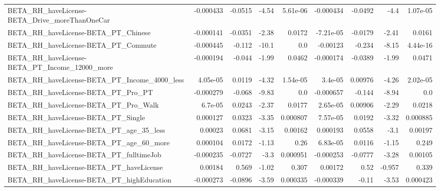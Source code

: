 \begin{tabular}{lrrrrrrrr}
BETA\_RH\_haveLicense-BETA\_Drive\_moreThanOneCar      &   -0.000433 &      -0.0515 &     -4.54 & 5.61e-06 &  -0.000434 &     -0.0492 &         -4.4 &      1.07e-05 \\
BETA\_RH\_haveLicense-BETA\_PT\_Chinese                &   -0.000141 &      -0.0351 &     -2.38 &   0.0172 &  -7.21e-05 &     -0.0179 &        -2.41 &        0.0161 \\
BETA\_RH\_haveLicense-BETA\_PT\_Commute                &   -0.000445 &       -0.112 &     -10.1 &      0.0 &   -0.00123 &      -0.234 &        -8.15 &      4.44e-16 \\
BETA\_RH\_haveLicense-BETA\_PT\_Income\_12000\_more      &   -0.000194 &       -0.044 &     -1.99 &   0.0462 &  -0.000174 &     -0.0389 &        -1.99 &        0.0471 \\
BETA\_RH\_haveLicense-BETA\_PT\_Income\_4000\_less       &    4.05e-05 &       0.0119 &     -4.32 & 1.54e-05 &    3.4e-05 &     0.00976 &        -4.26 &      2.02e-05 \\
BETA\_RH\_haveLicense-BETA\_PT\_Pro\_PT                 &   -0.000279 &       -0.068 &     -9.83 &      0.0 &  -0.000657 &      -0.144 &        -8.94 &           0.0 \\
BETA\_RH\_haveLicense-BETA\_PT\_Pro\_Walk               &     6.7e-05 &       0.0243 &     -2.37 &   0.0177 &   2.65e-05 &     0.00906 &        -2.29 &        0.0218 \\
BETA\_RH\_haveLicense-BETA\_PT\_Single                 &    0.000127 &       0.0323 &     -3.35 & 0.000807 &   7.57e-05 &      0.0192 &        -3.32 &      0.000885 \\
BETA\_RH\_haveLicense-BETA\_PT\_age\_35\_less            &     0.00023 &       0.0681 &     -3.15 &  0.00162 &   0.000193 &      0.0558 &         -3.1 &       0.00197 \\
BETA\_RH\_haveLicense-BETA\_PT\_age\_60\_more            &    0.000104 &       0.0172 &     -1.13 &     0.26 &   6.83e-05 &      0.0116 &        -1.15 &         0.249 \\
BETA\_RH\_haveLicense-BETA\_PT\_fulltimeJob            &   -0.000235 &      -0.0727 &      -3.3 & 0.000951 &  -0.000253 &     -0.0777 &        -3.28 &       0.00105 \\
BETA\_RH\_haveLicense-BETA\_PT\_haveLicense            &     0.00184 &        0.569 &     -1.02 &    0.307 &    0.00172 &        0.52 &       -0.957 &         0.339 \\
BETA\_RH\_haveLicense-BETA\_PT\_highEducation          &   -0.000273 &      -0.0896 &     -3.59 & 0.000335 &  -0.000339 &       -0.11 &        -3.53 &      0.000423 \\

\end{tabular}
